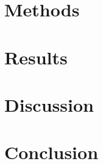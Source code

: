 \documentclass[a4paper,12pt]{article}   %
\numberwithin{equation}{section}        %
\begin{document}
	\section{Methods}
	
	\clearpage
	
	\section{Results}
	
	\clearpage
	
	\section{Discussion}
	
	\clearpage
	
	\section{Conclusion}
	
	\clearpage

    \clearpage	
    \renewcommand{\refname}{Reference} 	%
    \printbibliography
    \clearpage

    
    
\end{document}
